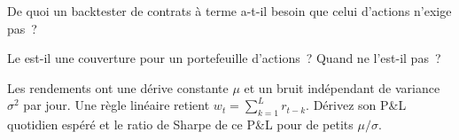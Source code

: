 \begin{interviewq}\label{iq:s1:trend-following:4}
De quoi un backtester de contrats à terme a-t-il besoin que celui d'actions n'exige pas~?
\end{interviewq}

\begin{interviewq}\label{iq:s1:trend-following:5}
Le  est-il une couverture pour un portefeuille d'actions~? Quand ne l'est-il pas~?
\end{interviewq}

\begin{interviewq}\label{iq:s1:trend-following:6}
Les rendements ont une dérive constante $\mu$ et un bruit indépendant de variance $\sigma^2$ par jour. Une règle linéaire retient $w_t = \sum_{k=1}^{L} r_{t-k}$. Dérivez son P\&L quotidien espéré
et le ratio de Sharpe de ce P\&L pour de petits $\mu/\sigma$.
\end{interviewq}
